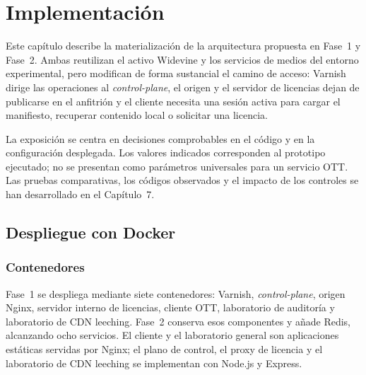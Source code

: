 
\chapter{Implementación}

Este capítulo describe la materialización de la arquitectura propuesta en Fase~1 y Fase~2. Ambas reutilizan el activo Widevine y los servicios de medios del entorno experimental, pero modifican de forma sustancial el camino de acceso: Varnish dirige las operaciones al \textit{control-plane}, el origen y el servidor de licencias dejan de publicarse en el anfitrión y el cliente necesita una sesión activa para cargar el manifiesto, recuperar contenido local o solicitar una licencia.

La exposición se centra en decisiones comprobables en el código y en la configuración desplegada. Los valores indicados corresponden al prototipo ejecutado; no se presentan como parámetros universales para un servicio OTT. Las pruebas comparativas, los códigos observados y el impacto de los controles se han desarrollado en el Capítulo~7.

\section{Despliegue con Docker}

\subsection{Contenedores}

Fase~1 se despliega mediante siete contenedores: Varnish, \textit{control-plane}, origen Nginx, servidor interno de licencias, cliente OTT, laboratorio de auditoría y laboratorio de CDN leeching. Fase~2 conserva esos componentes y añade Redis, alcanzando ocho servicios. El cliente y el laboratorio general son aplicaciones estáticas servidas por Nginx; el plano de control, el proxy de licencia y el laboratorio de CDN leeching se implementan con Node.js y Express.

